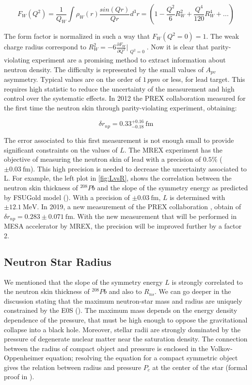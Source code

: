 \begin{equation}
F_{W}(Q^{2}) = \frac{1}{Q_{W}} \int \rho_{W}(r) \dfrac{sin(Qr)}{Qr} d^{3}r = (1 - \frac{Q^{2}}{6} R^{2}_{W} + \frac{Q^{4}}{120}R^{4}_{W} + ...)  
\end{equation}

The form factor is normalized in such a way that $F_{W}(Q^{2} = 0) = 1$. The weak charge radius correspond to $R^{2}_{W} = -6 \frac{\partial F_{W}}{\partial Q^{2}}\Bigr|_{\substack{Q^{2} = 0}}$. Now it is clear that parity-violating experiment are a promising method to extract information about neutron density. The difficulty is represented by the small values of $A_{pv}$ asymmetry. Typical values are on the order of $1 \, ppm$ or less, for lead target. This requires high statistic to reduce the uncertainty of the measurement and high control over the systematic effects. In 2012 the PREX collaboration measured for the first time the neutron skin through parity-violating experiment, obtaining:

\begin{equation} \label{eq:Prex}
\delta r_{np} = 0.33^{+0.16}_{-0.18} \SI{}{\femto \meter}
\end{equation}

The error associated to this first measurement is not enough small to provide significant constraints on the values of $L$. The MREX experiment has the objective of measuring the neutron skin of lead with a precision of $0.5 \%$  ($\pm \SI{0.03}{\femto \meter}$). This high precision is needed to decrease the uncertainty associated to L. For example, the left plot in \ref{fig:LvsR}, shows the correlation between the neutron skin thickness of $^{208}Pb$ and the slope of the symmetry energy as predicted by FSUGold model (\cite{Fattoyev_2011}). With a precision of $\pm \SI{0.03}{\femto \meter}$, $L$ is determined with $\pm \SI{12.1}{\mega \electronvolt}$. 
In 2019, a new measurement of the PREX collaboration \cite{PREX:2021umo}, obtain of $\delta r_{np} = 0.283 \pm 0.071 \SI{}{\femto \meter}$. With the new measurement that will be performed in MESA accelerator by MREX, the precision will be improved further by a factor 2.

\subsection{Neutron Star Radius}

We mentioned that the slope of the symmetry energy $L$ is strongly correlated to the neutron skin thickness of $^{208}Pb$ and also to $R_{ns}$. We can go deeper in the discussion stating that the maximum neutron-star mass and radius are uniquely constrained by the E0S (\cite{Lindblom1992DeterminingTN}). The maximum mass depends on the energy density dependence of the pressure, that must be high enough to oppose the gravitational collapse into a black hole. Moreover, stellar radii are strongly dominated by the pressure of degenerate nuclear matter near the saturation density.  
The connection between the radius of compact object and pressure is enclosed in the Volkov-Oppenheimer equation; resolving the equation for a compact symmetric object gives the relation between radius and pressure $P_{c}$ at the center of the star (formal proof in \cite{LATTIMER_2007}).

